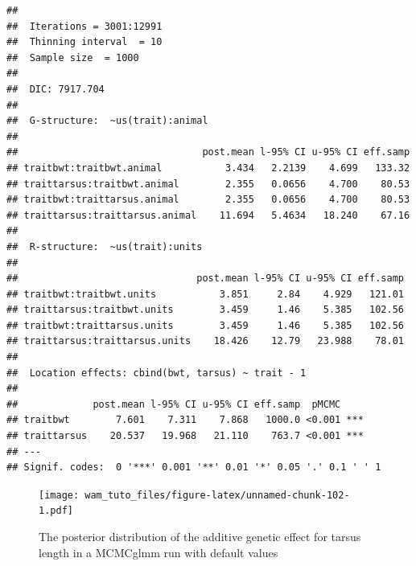\documentclass[
  12pt,
]{book}
\newenvironment{Shaded}{\begin{snugshade}}{\end{snugshade}}
\newcommand{\DecValTok}[1]{\textcolor[rgb]{0.00,0.00,0.81}{#1}}
\newcommand{\FloatTok}[1]{\textcolor[rgb]{0.00,0.00,0.81}{#1}}
\newcommand{\KeywordTok}[1]{\textcolor[rgb]{0.13,0.29,0.53}{\textbf{#1}}}
\newcommand{\NormalTok}[1]{#1}
\newcommand{\OperatorTok}[1]{\textcolor[rgb]{0.81,0.36,0.00}{\textbf{#1}}}
\newcommand{\StringTok}[1]{\textcolor[rgb]{0.31,0.60,0.02}{#1}}
\begin{document}
\begin{verbatim}
## 
##  Iterations = 3001:12991
##  Thinning interval  = 10
##  Sample size  = 1000 
## 
##  DIC: 7917.704 
## 
##  G-structure:  ~us(trait):animal
## 
##                                post.mean l-95% CI u-95% CI eff.samp
## traitbwt:traitbwt.animal           3.434   2.2139    4.699   133.32
## traittarsus:traitbwt.animal        2.355   0.0656    4.700    80.53
## traitbwt:traittarsus.animal        2.355   0.0656    4.700    80.53
## traittarsus:traittarsus.animal    11.694   5.4634   18.240    67.16
## 
##  R-structure:  ~us(trait):units
## 
##                               post.mean l-95% CI u-95% CI eff.samp
## traitbwt:traitbwt.units           3.851     2.84    4.929   121.01
## traittarsus:traitbwt.units        3.459     1.46    5.385   102.56
## traitbwt:traittarsus.units        3.459     1.46    5.385   102.56
## traittarsus:traittarsus.units    18.426    12.79   23.988    78.01
## 
##  Location effects: cbind(bwt, tarsus) ~ trait - 1 
## 
##             post.mean l-95% CI u-95% CI eff.samp  pMCMC    
## traitbwt        7.601    7.311    7.868   1000.0 <0.001 ***
## traittarsus    20.537   19.968   21.110    763.7 <0.001 ***
## ---
## Signif. codes:  0 '***' 0.001 '**' 0.01 '*' 0.05 '.' 0.1 ' ' 1
\end{verbatim}

\begin{Shaded}
\end{Shaded}

\begin{figure}
\centering
\texttt{[image: wam\_tuto\_files/figure-latex/unnamed-chunk-102-1.pdf]}
\caption{\label{fig:unnamed-chunk-102}The posterior distribution of the additive genetic effect for tarsus length in a MCMCglmm run with default values}
\end{figure}

\begin{Shaded}
\end{Shaded}
\end{document}
